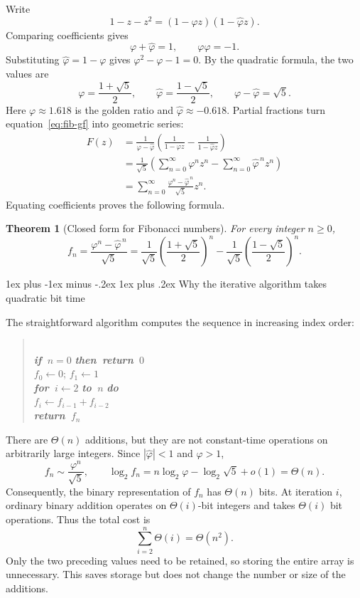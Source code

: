 \documentclass[11pt]{article}
\makeatletter
\renewcommand{\subsection}{\@startsection{subsection}{2}{0mm}%
                                     {1ex plus -1ex minus -.2ex}%
                                     {1ex plus .2ex}%
                                     {\normalfont\large\bfseries}}%
\newtheorem{theorem}[fact]{Theorem}
\newcommand{\xif}{{\bf{\em{if~}}}}
\newcommand{\xthen}{{\bf{\em{then~}}}}
\newcommand{\xfor}{{\bf{\em{for~}}}}
\newcommand{\xto}{{\bf{\em{to~}}}}
\newcommand{\xdo}{{\bf{\em{do~}}}}
\newcommand{\xreturn}{{\bf{\em{return~}}}}
\newcommand{\T}{\hspace{0.5cm}}
\def\func#1{\textrm{\bf{\sc{#1}}}}
\makeatother
\begin{document}
Write
\[
 1-z-z^2=(1-\varphi z)(1-\widehat\varphi z).
\]
Comparing coefficients gives
\[
 \varphi+\widehat\varphi=1,\qquad
 \varphi\widehat\varphi=-1.
\]
Substituting $\widehat\varphi=1-\varphi$ gives
$\varphi^2-\varphi-1=0$. By the quadratic formula, the two values are
\[
 \varphi=\frac{1+\sqrt5}{2},\qquad
 \widehat\varphi=\frac{1-\sqrt5}{2},\qquad
 \varphi-\widehat\varphi=\sqrt5.
\]
Here $\varphi\approx1.618$ is the golden ratio and
$\widehat\varphi\approx-0.618$. Partial fractions turn
 equation~\eqref{eq:fib-gf} into geometric series:
\begin{align*}
 F(z)
 &=\frac{1}{\varphi-\widehat\varphi}
   \left(\frac{1}{1-\varphi z}
             -\frac{1}{1-\widehat\varphi z}\right)\\
 &=\frac{1}{\sqrt5}
   \left(\sum_{n=0}^{\infty}\varphi^n z^n
             -\sum_{n=0}^{\infty}\widehat\varphi^{\,n}z^n\right)\\
 &=\sum_{n=0}^{\infty}
       \frac{\varphi^n-\widehat\varphi^{\,n}}{\sqrt5}z^n.
\end{align*}
Equating coefficients proves the following formula.
\begin{theorem}[Closed form for Fibonacci numbers]
For every integer $n\geq0$,
\[
 \boxed{f_n=\frac{\varphi^n-\widehat\varphi^{\,n}}{\sqrt5}
 =\frac{1}{\sqrt5}\left(\frac{1+\sqrt5}{2}\right)^n
  -\frac{1}{\sqrt5}\left(\frac{1-\sqrt5}{2}\right)^n.}
\]
\end{theorem}

\subsection{Why the iterative algorithm takes quadratic bit time}

The straightforward algorithm computes the sequence in increasing index order:
\begin{quote}
\func{Fibonacci$(n)$}\\
\xif $n=0$ \xthen \xreturn $0$\\
$f_0\leftarrow0$; $f_1\leftarrow1$\\
\xfor $i\leftarrow2$ \xto $n$ \xdo\\
\T $f_i\leftarrow f_{i-1}+f_{i-2}$\\
\xreturn $f_n$
\end{quote}
There are $\Theta(n)$ additions, but they are not constant-time operations on
arbitrarily large integers. Since $|\widehat\varphi|<1$ and $\varphi>1$,
\[
 f_n\sim\frac{\varphi^n}{\sqrt5},\qquad
 \log_2 f_n=n\log_2\varphi-\log_2\sqrt5+o(1)=\Theta(n).
\]
Consequently, the binary representation of $f_n$ has $\Theta(n)$ bits.
At iteration $i$, ordinary binary addition operates on $\Theta(i)$-bit integers
and takes $\Theta(i)$ bit operations. Thus the total cost is
\[
 \sum_{i=2}^{n}\Theta(i)=\boxed{\Theta(n^2)}.
\]
Only the two preceding values need to be retained, so storing the entire array
is unnecessary. This saves storage but does not change the number or size of
the additions.
\end{document}
